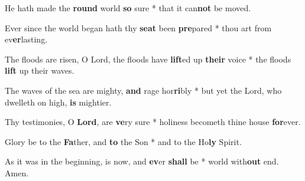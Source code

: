 \begin{multicols}{2}
	He hath made the \textbf{round} world \textbf{so} sure * that it can\textbf{not} be moved.
	
	Ever since the world began hath thy \textbf{seat} been \textbf{pre}pared * thou art from ev\textbf{er}lasting.
	
	The floods are risen, O Lord, the floods have \textbf{lift}ed up \textbf{their} voice * the floods \textbf{lift} up their waves.
	
	The waves of the sea are mighty, \textbf{and} rage hor\textbf{ri}bly * but yet the Lord, who dwelleth on high, \textbf{is} mightier.
	
	Thy testimonies, O \textbf{Lord}, are \textbf{ve}ry sure * holiness becometh thine house \textbf{for}ever.
	
	Glory be to the \textbf{Fa}ther, and \textbf{to} the Son * and to the Ho\textbf{ly} Spirit.
	
	As it was in the beginning, is now, and \textbf{ev}er \textbf{shall} be * world with\textbf{out} end. Amen.
\end{multicols}